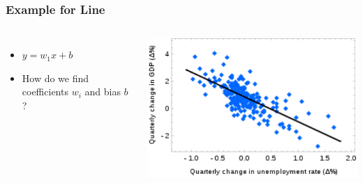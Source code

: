 \begin{frame}
    \frametitle{Example for Line}
    \begin{columns}
            \begin{itemize}
                \item $y =  w_1 x + b$
                \item How do we find coefficients $w_i$ and bias $b$ ? 
            \end{itemize}
            \includegraphics[width=1\linewidth]{linreg-pics/lg}\\

    \end{columns}
\end{frame}





